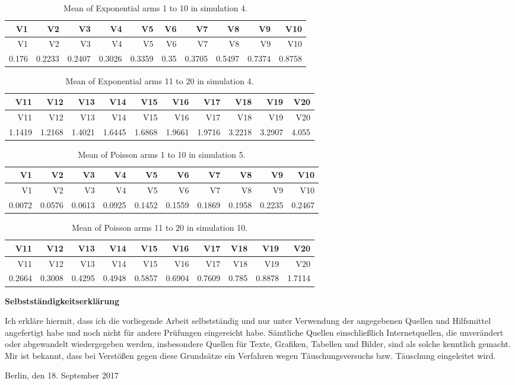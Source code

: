 \documentclass[11pt,]{article}
\begin{document}
\begin{longtable}[]{@{}rrrrrrrrrr@{}}
\caption{Mean of Exponential arms 1 to 10 in simulation
4.}\tabularnewline
\toprule
V1 & V2 & V3 & V4 & V5 & V6 & V7 & V8 & V9 & V10\tabularnewline
\midrule
\endfirsthead
\toprule
V1 & V2 & V3 & V4 & V5 & V6 & V7 & V8 & V9 & V10\tabularnewline
\midrule
\endhead
0.176 & 0.2233 & 0.2407 & 0.3026 & 0.3359 & 0.35 & 0.3705 & 0.5497 &
0.7374 & 0.8758\tabularnewline
\bottomrule
\end{longtable}

\begin{longtable}[]{@{}rrrrrrrrrr@{}}
\caption{Mean of Exponential arms 11 to 20 in simulation
4.}\tabularnewline
\toprule
V11 & V12 & V13 & V14 & V15 & V16 & V17 & V18 & V19 & V20\tabularnewline
\midrule
\endfirsthead
\toprule
V11 & V12 & V13 & V14 & V15 & V16 & V17 & V18 & V19 & V20\tabularnewline
\midrule
\endhead
1.1419 & 1.2168 & 1.4021 & 1.6445 & 1.6868 & 1.9661 & 1.9716 & 3.2218 &
3.2907 & 4.055\tabularnewline
\bottomrule
\end{longtable}

\begin{longtable}[]{@{}rrrrrrrrrr@{}}
\caption{Mean of Poisson arms 1 to 10 in simulation 5.}\tabularnewline
\toprule
V1 & V2 & V3 & V4 & V5 & V6 & V7 & V8 & V9 & V10\tabularnewline
\midrule
\endfirsthead
\toprule
V1 & V2 & V3 & V4 & V5 & V6 & V7 & V8 & V9 & V10\tabularnewline
\midrule
\endhead
0.0072 & 0.0576 & 0.0613 & 0.0925 & 0.1452 & 0.1559 & 0.1869 & 0.1958 &
0.2235 & 0.2467\tabularnewline
\bottomrule
\end{longtable}

\begin{longtable}[]{@{}rrrrrrrrrr@{}}
\caption{Mean of Poisson arms 11 to 20 in simulation 10.}\tabularnewline
\toprule
V11 & V12 & V13 & V14 & V15 & V16 & V17 & V18 & V19 & V20\tabularnewline
\midrule
\endfirsthead
\toprule
V11 & V12 & V13 & V14 & V15 & V16 & V17 & V18 & V19 & V20\tabularnewline
\midrule
\endhead
0.2664 & 0.3008 & 0.4295 & 0.4948 & 0.5857 & 0.6904 & 0.7609 & 0.785 &
0.8878 & 1.7114\tabularnewline
\bottomrule
\end{longtable}

\newpage


\Large{\bf Selbstständigkeitserklärung\\}

\vspace*{1.5\baselineskip}

\large Ich erkläre hiermit, dass ich die vorliegende Arbeit
selbstständig und nur unter Verwendung der angegebenen Quellen und
Hilfsmittel angefertigt habe und noch nicht für andere Prüfungen
eingereicht habe. Sämtliche Quellen einschließlich Internetquellen, die
unverändert oder abgewandelt wiedergegeben werden, insbesondere Quellen
für Texte, Grafiken, Tabellen und Bilder, sind als solche kenntlich
gemacht. Mir ist bekannt, dass bei Verstößen gegen diese Grundsätze ein
Verfahren wegen Täuschungsversuchs bzw. Täuschung eingeleitet wird.

\vspace*{3\baselineskip}

Berlin, den 18. September 2017
\end{document}

